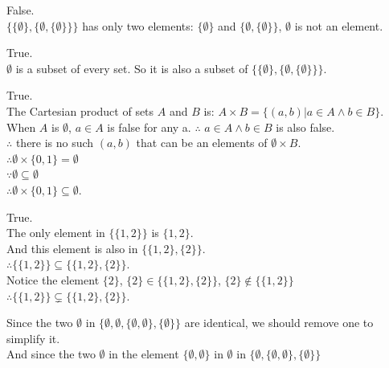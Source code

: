 \documentclass[12pt]{exam}
\begin{document}
\begin{solution}
    \begin{qparts}
        \item 
        \begin{qsubparts}
            \item False.\\
            $\{\{\emptyset\}, \{\emptyset , \{\emptyset\}\}\}$ has only two elements: $\{\emptyset\}$ and $\{ \emptyset, \{ \emptyset\}\}$, $\emptyset$ is not an element.
            \item True.\\
            $\emptyset$ is a subset of every set. So it is also a subset of $\{\{\emptyset\}, \{\emptyset , \{\emptyset\}\}\}$.
            \item True.\\
            The Cartesian product of sets $A$ and $B$ is: $ A \times B = \{ (a,b)| a \in A \land b \in B\}$.\\
            When $A$ is $\emptyset$, $a\in A$ is false for any a. $\therefore$ $a \in A \land b \in B$ is also false.\\
            $\therefore$ there is no such $(a,b)$ that can be an elements of $\emptyset \times B$.\\
            $\therefore \emptyset \times  \{0,1\} = \emptyset$\\ 
            $\because \emptyset \subseteq \emptyset$\\
            $\therefore \emptyset \times \{ 0,1\} \subseteq \emptyset$.   
            \item True.\\
            The only element in $\{\{1, 2\}\}$ is $\{1,2\}$.\\
            And this element is also in $\{ \{1,2\}, \{2\} \}$.\\
            $\therefore \{\{1, 2\}\} \subseteq \{ \{1,2\}, \{2\} \}$.\\
            Notice the element $\{2\}$, $\{2\} \in \{ \{1,2\}, \{2\} \}$, $\{2\} \notin \{\{1, 2\}\}$\\
            $\therefore \{\{1, 2\}\} \subsetneq \{ \{1,2\}, \{2\} \}$.
        \end{qsubparts}
        \item 
        Since the two $\emptyset$ in $\{\emptyset, \emptyset, \{\emptyset, \emptyset\}, \{\emptyset\}\}$ are identical,
        we should remove one to simplify it.\\
        And since the two $\emptyset$ in the element $\{\emptyset, \emptyset\}$ in $\emptyset$ in $\{\emptyset, \{\emptyset, \emptyset\}, \{\emptyset\}\}$

\end{qparts}
\end{solution}
\end{document}
